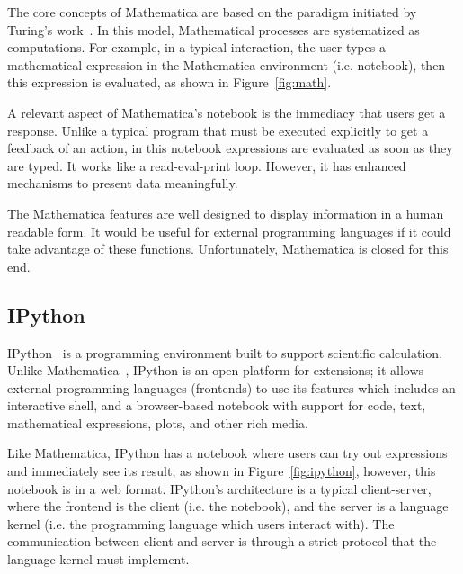 The core concepts of Mathematica are based on the paradigm initiated by Turing's work~\citep{wolfram2003wolfram}. In this model, Mathematical processes are systematized as computations. For example, in a typical interaction, the user types a mathematical expression in the Mathematica environment (i.e. notebook), then this expression is evaluated, as shown in Figure~\ref{fig:math}.  

A relevant aspect of Mathematica's notebook is the immediacy that users get a response. Unlike a typical program that must be executed explicitly to get a feedback of an action, in this notebook expressions are evaluated as soon as they are typed. It works like a read-eval-print loop. However, it has enhanced mechanisms to present data meaningfully.

The Mathematica features are well designed to display information in a human readable form. It would be useful for external programming languages if it could take advantage of these functions. Unfortunately, Mathematica is closed for this end.
\subsection{IPython}
\label{subsec:ipython}

IPython~\citep{PER-GRA:2007} is a programming environment built to support scientific calculation. Unlike Mathematica~\citep{wolfram1991mathematica},  IPython is an open platform for extensions; it allows external programming languages (frontends) to use its features which includes an interactive shell, and a browser-based notebook with support for code, text, mathematical expressions, plots, and other rich media. 

Like Mathematica, IPython has a notebook where users can try out expressions and immediately see its result, as shown in Figure~\ref{fig:ipython}, however, this notebook is in a web format. IPython's architecture is a typical client-server, where the frontend is the client (i.e. the notebook), and the server is a language kernel (i.e. the programming language which users interact with). The communication between client and server is through a strict protocol that the language kernel must implement. 

